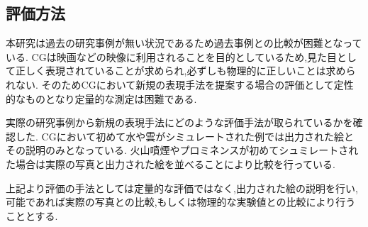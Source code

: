 \subsection{評価方法}
本研究は過去の研究事例が無い状況であるため過去事例との比較が困難となっている.
CGは映画などの映像に利用されることを目的としているため,見た目として正しく表現されていることが求められ,必ずしも物理的に正しいことは求められない.
そのためCGにおいて新規の表現手法を提案する場合の評価として定性的なものとなり定量的な測定は困難である.

実際の研究事例から新規の表現手法にどのような評価手法が取られているかを確認した.
CGにおいて初めて水\cite{Foster1996}や雲\cite{Gardner1985}がシミュレートされた例では出力された絵とその説明のみとなっている.
火山噴煙\cite{Mizuno2003}やプロミネンス\cite{Ishikawa}が初めてシュミレートされた場合は実際の写真と出力された絵を並べることにより比較を行っている.

上記より評価の手法としては定量的な評価ではなく,出力された絵の説明を行い,可能であれば実際の写真との比較,もしくは物理的な実験値との比較により行うこととする.

